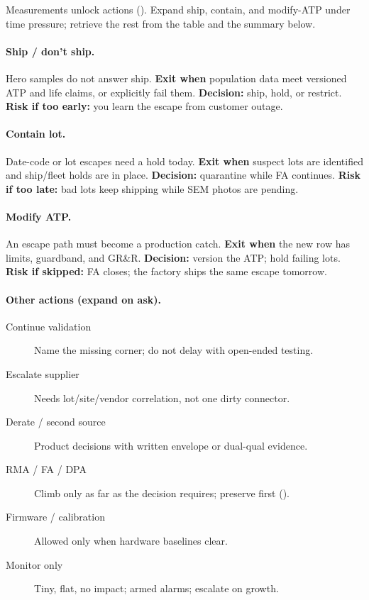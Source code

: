 Measurements unlock actions (). Expand
ship, contain, and modify-ATP under time pressure; retrieve the rest from
the table and the summary below.

\paragraph{Ship / don't ship.}
Hero samples do not answer ship. \textbf{Exit when} population data meet
versioned ATP and life claims, or explicitly fail them. \textbf{Decision:}
ship, hold, or restrict. \textbf{Risk if too early:} you learn the escape
from customer outage.

\paragraph{Contain lot.}
Date-code or lot escapes need a hold today. \textbf{Exit when} suspect lots
are identified and ship/fleet holds are in place. \textbf{Decision:}
quarantine while FA continues. \textbf{Risk if too late:} bad lots keep
shipping while SEM photos are pending.

\paragraph{Modify ATP.}
An escape path must become a production catch. \textbf{Exit when} the new
row has limits, guardband, and GR\&R. \textbf{Decision:} version the ATP;
hold failing lots. \textbf{Risk if skipped:} FA closes; the factory ships
the same escape tomorrow.

\paragraph{Other actions (expand on ask).}
\begin{description}
\item[Continue validation] Name the missing corner; do not delay with
      open-ended testing.
\item[Escalate supplier] Needs lot/site/vendor correlation, not one dirty
      connector.
\item[Derate / second source] Product decisions with written envelope or
      dual-qual evidence.
\item[RMA / FA / DPA] Climb only as far as the decision requires; preserve
      first ().
\item[Firmware / calibration] Allowed only when hardware baselines clear.
\item[Monitor only] Tiny, flat, no impact; armed alarms; escalate on growth.
\end{description}

